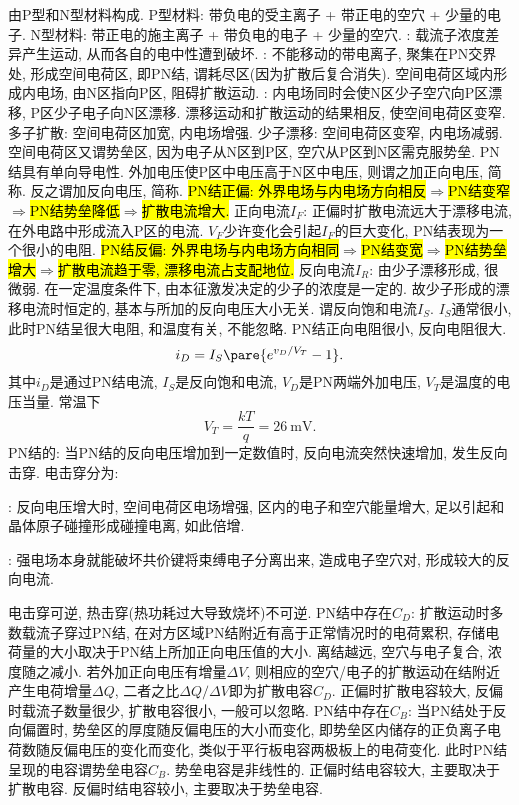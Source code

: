 \documentclass[hidelinks]{ctexart}
\begin{document}
\newpoint{}由P型和N型材料构成. P型材料: 带负电的受主离子 + 带正电的空穴 + 少量的电子. N型材料: 带正电的施主离子 + 带负电的电子 + 少量的空穴.
\newpoint{}: 载流子浓度差异产生运动, 从而各自的电中性遭到破坏.
\newpoint{}: 不能移动的带电离子, 聚集在PN交界处, 形成空间电荷区, 即PN结, 谓耗尽区(因为扩散后复合消失). 
\newpoint{}空间电荷区域内形成内电场, 由N区指向P区, 阻碍扩散运动.
\newpoint{}: 内电场同时会使N区少子空穴向P区漂移, P区少子电子向N区漂移. 漂移运动和扩散运动的结果相反, 使空间电荷区变窄.
\newpoint{}多子扩散: 空间电荷区加宽, 内电场增强. 少子漂移: 空间电荷区变窄, 内电场减弱. 空间电荷区又谓势垒区, 因为电子从N区到P区, 空穴从P区到N区需克服势垒.
\newpoint{}PN结具有单向导电性. 外加电压使P区中电压高于N区中电压, 则谓之加正向电压, 简称. 反之谓加反向电压, 简称.
\newpoint{}\hl{PN结正偏: 外界电场与内电场方向相反}$\Rightarrow $\hl{PN结变窄}$\Rightarrow $\hl{PN结势垒降低}$\Rightarrow $\hl{扩散电流增大.}
\newpoint{}正向电流$I_F$: 正偏时扩散电流远大于漂移电流, 在外电路中形成流入P区的电流.
\newpoint{}$V_F$少许变化会引起$I_F$的巨大变化, PN结表现为一个很小的电阻.
\newpoint{}\hl{PN结反偏: 外界电场与内电场方向相同}$\Rightarrow $\hl{PN结变宽}$\Rightarrow $\hl{PN结势垒增大}$\Rightarrow $\hl{扩散电流趋于零, 漂移电流占支配地位.}
\newpoint{}反向电流$I_R$: 由少子漂移形成, 很微弱.
\newpoint{}在一定温度条件下, 由本征激发决定的少子的浓度是一定的. 故少子形成的漂移电流时恒定的, 基本与所加的反向电压大小无关. 谓反向饱和电流$I_S$.
\newpoint{}$I_S$通常很小, 此时PN结呈很大电阻, 和温度有关, 不能忽略.
\newpoint{}PN结正向电阻很小, 反向电阻很大.
\[ i_D = I_S\pare{e^{v_D/V_T} - 1}. \]
其中$i_D$是通过PN结电流, $I_S$是反向饱和电流, $V_D$是PN两端外加电压, $V_T$是温度的电压当量. 常温下
\[ V_T = \frac{kT}{q} = \SI{26}{\milli\volt}. \]
\newpoint{}PN结的: 当PN结的反向电压增加到一定数值时, 反向电流突然快速增加, 发生反向击穿. 电击穿分为:
\begin{cenum}
    \item {}: 反向电压增大时, 空间电荷区电场增强, 区内的电子和空穴能量增大, 足以引起和晶体原子碰撞形成碰撞电离, 如此倍增.
    \item {}: 强电场本身就能破坏共价键将束缚电子分离出来, 造成电子空穴对, 形成较大的反向电流.
\end{cenum}
电击穿可逆, 热击穿(热功耗过大导致烧坏)不可逆.
\newpoint{}PN结中存在$C_D$: 扩散运动时多数载流子穿过PN结, 在对方区域PN结附近有高于正常情况时的电荷累积, 存储电荷量的大小取决于PN结上所加正向电压值的大小. 离结越远, 空穴与电子复合, 浓度随之减小. 若外加正向电压有增量$\Delta V$, 则相应的空穴/电子的扩散运动在结附近产生电荷增量$\Delta Q$, 二者之比$\Delta Q/\Delta V$即为扩散电容$C_D$.
\newpoint{}正偏时扩散电容较大, 反偏时载流子数量很少, 扩散电容很小, 一般可以忽略.
\newpoint{}PN结中存在$C_B$: 当PN结处于反向偏置时, 势垒区的厚度随反偏电压的大小而变化, 即势垒区内储存的正负离子电荷数随反偏电压的变化而变化, 类似于平行板电容两极板上的电荷变化. 此时PN结呈现的电容谓势垒电容$C_B$.
\newpoint{}势垒电容是非线性的. 正偏时结电容较大, 主要取决于扩散电容. 反偏时结电容较小, 主要取决于势垒电容.
\end{document}
